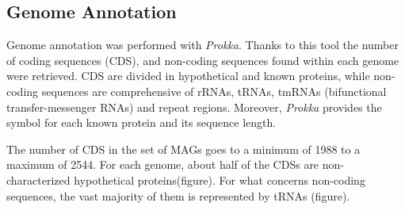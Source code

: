 \subsection*{Genome Annotation}
\graphicspath{{images/genomeAnnotation}}


Genome annotation was performed with \textit{Prokka}. Thanks to this tool the number of coding sequences (CDS), and non-coding sequences found within each genome were retrieved. CDS are divided in hypothetical and known proteins, while non-coding sequences are comprehensive of rRNAs, tRNAs, tmRNAs (bifunctional transfer-messenger RNAs) and repeat regions. Moreover, \textit{Prokka} provides the symbol for each known protein and its sequence length.

The number of CDS in the set of MAGs goes to a minimum of 1988 to a maximum of 2544. For each genome, about half of the CDSs are non-characterized hypothetical proteins(figure). For what concerns non-coding sequences, the vast majority of them is represented by tRNAs (figure).
